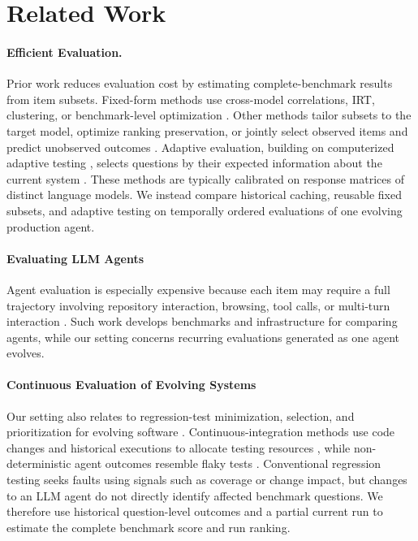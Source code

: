 \section{Related Work}
\label{sec:related-work}

\paragraph{Efficient Evaluation.}

Prior work reduces evaluation cost by estimating complete-benchmark results
from item subsets. Fixed-form methods use cross-model correlations, IRT, clustering, or benchmark-level optimization
\citep{vivek2024anchor,maiapolo2024tinybenchmarks,perlitz2024efficient,kipnis2025metabench,fogliato-etal-2024-precise}.
Other methods tailor subsets to the target model, optimize ranking preservation,
or jointly select observed items and predict unobserved outcomes
\citep{yuan2025beyond,saranathan2025sublime,li2025active}. Adaptive evaluation,
building on computerized adaptive testing \citep{lord1980applications}, selects
questions by their expected information about the current system
\citep{truong2025reliable}. These methods are typically calibrated on response
matrices of distinct language models. We instead compare historical caching,
reusable fixed subsets, and adaptive testing on temporally ordered evaluations
of one evolving production agent.



\paragraph{Evaluating LLM Agents}
Agent evaluation is especially expensive because each item may require a full
trajectory involving repository interaction, browsing, tool calls, or
multi-turn interaction
\citep{jimenez2024swe,mialon2024gaia,yao2024tau}. 
Such work develops benchmarks and infrastructure
for comparing agents, while our setting concerns recurring evaluations generated as one agent evolves.


\paragraph{Continuous Evaluation of Evolving Systems}
Our setting also relates to regression-test minimization, selection, and
prioritization for evolving software
\citep{rothermel1997safe,yoo2012regression}. Continuous-integration methods use
code changes and historical executions to allocate testing resources
\citep{kim2002history,elbaum2014techniques,machalica2019predictive}, while
non-deterministic agent outcomes resemble flaky tests
\citep{luo2014empirical}. Conventional regression testing seeks faults using
signals such as coverage or change impact, but changes to an LLM agent do not
directly identify affected benchmark questions. We therefore use historical
question-level outcomes and a partial current run to estimate the complete
benchmark score and run ranking.


